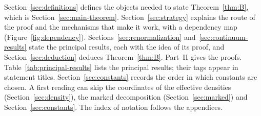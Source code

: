 Section~\ref{sec:definitions} defines the objects needed to state Theorem~\ref{thm:B}, which is Section~\ref{sec:main-theorem}. Section~\ref{sec:strategy} explains the route of the proof and the mechanisms that make it work, with a dependency map (Figure~\ref{fig:dependency}). Sections~\ref{sec:renormalization} and~\ref{sec:continuum-results} state the principal results, each with the idea of its proof, and Section~\ref{sec:deduction} deduces Theorem~\ref{thm:B}. Part~II gives the proofs. Table~\ref{tab:principal-results} lists the principal results; their tags appear in statement titles. Section~\ref{sec:constants} records the order in which constants are chosen. A first reading can skip the coordinates of the effective densities (Section~\ref{sec:density}), the marked decomposition (Section~\ref{sec:marked}) and Section~\ref{sec:constants}. The index of notation follows the appendices.

